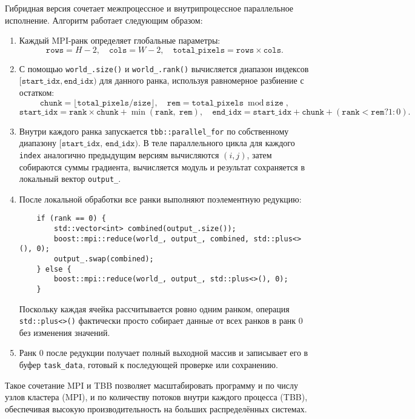 \documentclass[12pt]{article}
\begin{document}
Гибридная версия сочетает межпроцессное и внутрипроцессное параллельное исполнение. Алгоритм работает следующим образом:
\begin{enumerate}
    \item Каждый MPI-ранк определяет глобальные параметры:
    \[
        \texttt{rows} = H - 2,\quad \texttt{cols} = W - 2,\quad \texttt{total\_pixels} = \texttt{rows} \times \texttt{cols}.
    \]
    \item С помощью \texttt{world\_.size()} и \texttt{world\_.rank()} вычисляется диапазон индексов \([\texttt{start\_idx}, \texttt{end\_idx})\) для данного ранка, используя равномерное разбиение с остатком:
    \[
        \texttt{chunk} = \lfloor \texttt{total\_pixels} / \texttt{size} \rfloor,\quad 
        \texttt{rem} = \texttt{total\_pixels} \bmod \texttt{size},
    \]
    \[
        \texttt{start\_idx} = \texttt{rank} \times \texttt{chunk} + \min(\texttt{rank},\;\texttt{rem}),\quad
        \texttt{end\_idx} = \texttt{start\_idx} + \texttt{chunk} + (\texttt{rank} < \texttt{rem} ? 1 : 0).
    \]
    \item Внутри каждого ранка запускается \texttt{tbb::parallel_for} по собственному диапазону \([\texttt{start\_idx},\,\texttt{end\_idx})\). В теле параллельного цикла для каждого \texttt{index} аналогично предыдущим версиям вычисляются $(i,j)$, затем собираются суммы градиента, вычисляется модуль и результат сохраняется в локальный вектор \texttt{output\_}.
    \item После локальной обработки все ранки выполняют поэлементную редукцию:
    \begin{verbatim}
    if (rank == 0) {
        std::vector<int> combined(output_.size());
        boost::mpi::reduce(world_, output_, combined, std::plus<>(), 0);
        output_.swap(combined);
    } else {
        boost::mpi::reduce(world_, output_, std::plus<>(), 0);
    }
    \end{verbatim}
    Поскольку каждая ячейка рассчитывается ровно одним ранком, операция \texttt{std::plus<>()} фактически просто собирает данные от всех ранков в ранк 0 без изменения значений.
    \item Ранк 0 после редукции получает полный выходной массив и записывает его в буфер \texttt{task\_data}, готовый к последующей проверке или сохранению.
\end{enumerate}
Такое сочетание MPI и TBB позволяет масштабировать программу и по числу узлов кластера (MPI), и по количеству потоков внутри каждого процесса (TBB), обеспечивая высокую производительность на больших распределённых системах.
\end{document}
